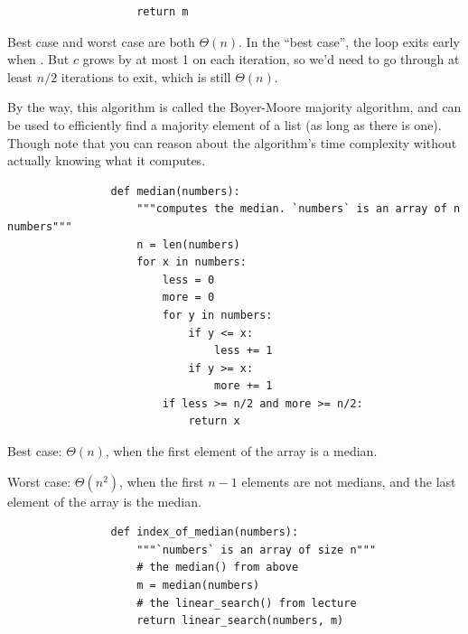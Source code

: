 \begin{prob}
\begin{subprobset}
\begin{subprob}
\begin{verbatim}
                    return m
            \end{verbatim}
            

            \begin{soln}
                Best case and worst case are both $\Theta(n)$. In the ``best case'',
                the loop exits early when . But $c$ grows by
                at most 1 on each iteration, so we'd need to go through at least
                $n / 2$ iterations to exit, which is still $\Theta(n)$.

                By the way, this algorithm is called the Boyer-Moore majority algorithm,
                and can be used to efficiently find a majority element of a list (as long
                as there is one). Though note that you can reason about the
                algorithm's time complexity without actually knowing what it
                computes.
            \end{soln}
        \end{subprob}

        \begin{subprob}
            \begin{verbatim}
                def median(numbers):
                    """computes the median. `numbers` is an array of n numbers"""
                    n = len(numbers)
                    for x in numbers:
                        less = 0
                        more = 0
                        for y in numbers:
                            if y <= x:
                                less += 1
                            if y >= x:
                                more += 1
                        if less >= n/2 and more >= n/2:
                            return x
            \end{verbatim}
            
            \begin{soln}
                Best case: $\Theta(n)$, when the first element of the array is a median.

                Worst case: $\Theta(n^2)$, when the first $n-1$ elements are not medians, and the last element of the array is the median.
            \end{soln}
        \end{subprob}

        \begin{subprob}
            \begin{verbatim}
                def index_of_median(numbers):
                    """`numbers` is an array of size n"""
                    # the median() from above
                    m = median(numbers)
                    # the linear_search() from lecture
                    return linear_search(numbers, m)
            \end{verbatim}
            


\end{subprob}
\end{subprobset}
\end{prob}
